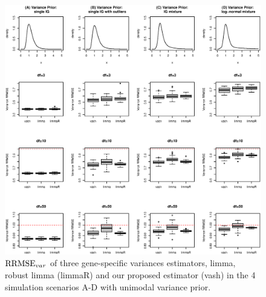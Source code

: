 \documentclass{bioinfo}
\begin{document}


\begin{figure}[!hbp]
\includegraphics[width=\linewidth]{relmse_var.eps}
\caption{$\textrm{RRMSE}_{var}$ of three gene-specific variances estimators, limma, robust limma (limmaR) and our proposed estimator (vash) in the 4 simulation scenarios A-D with unimodal variance prior.}
\label{fg:rrmse1}
\end{figure}
\end{document}
